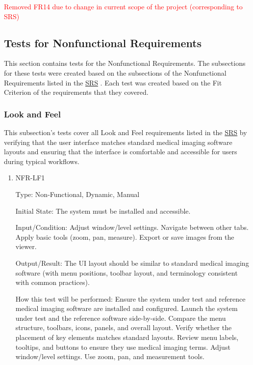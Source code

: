 \documentclass[12pt, titlepage]{article}
\begin{document}
\begin{enumerate}
\textcolor{red}{Removed FR14 due to change in current scope of the project (corresponding to SRS)}

\subsection{Tests for Nonfunctional Requirements}

This section contains tests for the Nonfunctional Requirements. The subsections for these tests were created based on the subsections of the Nonfunctional Requirements listed in the \href{https://github.com/RezaJodeiri/CXR-Capstone/blob/main/docs/SRS/SRS.pdf}{SRS} \citep{SRS}
. Each test was created based on the Fit Criterion of the requirements that they covered.

\subsubsection{Look and Feel}

This subsection's tests cover all Look and Feel requirements listed in the \href{https://github.com/RezaJodeiri/CXR-Capstone/blob/main/docs/SRS/SRS.pdf}{SRS} \citep{SRS}
 by verifying that the user interface matches standard medical imaging software layouts and ensuring that the interface is comfortable and accessible for users during typical workflows.

\begin{enumerate}

\item{NFR-LF1}\label{NFR-LF1}

Type: Non-Functional, Dynamic, Manual

Initial State: The system must be installed and accessible.

Input/Condition: Adjust window/level settings. Navigate between other tabs. Apply basic tools (zoom, pan, measure). Export or save images from the viewer.

Output/Result: The UI layout should be similar to standard medical imaging software (with menu positions, toolbar layout, and terminology consistent with common practices).

How this test will be performed: Ensure the system under test and reference medical imaging software are installed and configured. Launch the system under test and the reference software side-by-side. Compare the menu structure, toolbars, icons, panels, and overall layout. Verify whether the placement of key elements matches standard layouts. Review menu labels, tooltips, and buttons to ensure they use medical imaging terms. Adjust window/level settings. Use zoom, pan, and measurement tools.


\end{enumerate}
\end{enumerate}
\end{document}
